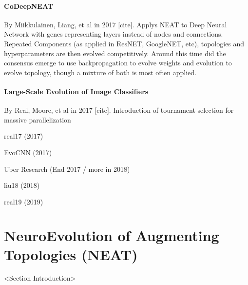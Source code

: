 \documentclass[journal, a4paper]{IEEEtran}
\begin{document}
\paragraph{CoDeepNEAT} By Miikkulainen, Liang, et al in 2017 [cite]. Applys NEAT to Deep Neural Network with genes representing layers instead of nodes and connections. Repeated Components (as applied in ResNET, GoogleNET, etc), topologies and hyperparameters are then evolved competitively. Around this time did the consensus emerge to use backpropagation to evolve weights and evolution to evolve topology, though a mixture of both is most often applied.

\paragraph{Large-Scale Evolution of Image Classifiers} By Real, Moore, et al in 2017 [cite]. Introduction of tournament selection for massive parallelization 


real17 (2017)

EvoCNN (2017)

Uber Research (End 2017 / more in 2018)

liu18 (2018)

real19 (2019)






\section{NeuroEvolution of Augmenting Topologies (NEAT)} \label{sec:neat}


<Section Introduction>
\end{document}

